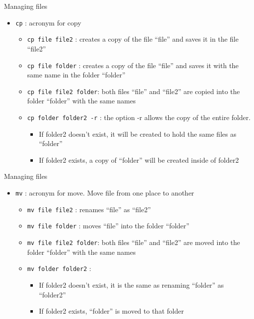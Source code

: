 \documentclass[
  ignorenonframetext,
]{beamer}
\providecommand{\tightlist}{%
  \setlength{\itemsep}{0pt}\setlength{\parskip}{0pt}}
\begin{document}
\begin{frame}[fragile]{Managing files}
\protect\hypertarget{slide14}{}
\begin{itemize}[<+->]
\tightlist
\item
  {\texttt{cp}} : acronym for copy

  \begin{itemize}[<+->]
  \tightlist
  \item
    {\texttt{cp\ file\ file2}} : creates a copy of the file ``file'' and
    saves it in the file ``file2''
  \item
    {\texttt{cp\ file\ folder}} : creates a copy of the file ``file''
    and saves it with the same name in the folder ``folder''
  \item
    {\texttt{cp\ file\ file2\ folder}}: both files ``file'' and
    ``file2'' are copied into the folder ``folder'' with the same names
  \item
    {\texttt{cp\ folder\ folder2\ -r}} : the option -r allows the copy
    of the entire folder.

    \begin{itemize}[<+->]
    \tightlist
    \item
      If folder2 doesn't exist, it will be created to hold the same
      files as ``folder''
    \item
      If folder2 exists, a copy of ``folder'' will be created inside of
      folder2
    \end{itemize}
  \end{itemize}
\end{itemize}
\end{frame}

\begin{frame}[fragile]{Managing files}
\protect\hypertarget{slide15}{}
\begin{itemize}[<+->]
\tightlist
\item
  {\texttt{mv}} : acronym for move. Move file from one place to another

  \begin{itemize}[<+->]
  \tightlist
  \item
    {\texttt{mv\ file\ file2}} : renames ``file'' as ``file2''
  \item
    {\texttt{mv\ file\ folder}} : moves ``file'' into the folder
    ``folder''
  \item
    {\texttt{mv\ file\ file2\ folder}}: both files ``file'' and
    ``file2'' are moved into the folder ``folder'' with the same names
  \item
    {\texttt{mv\ folder\ folder2}} :

    \begin{itemize}[<+->]
    \tightlist
    \item
      If folder2 doesn't exist, it is the same as renaming ``folder'' as
      ``folder2''
    \item
      If folder2 exists, ``folder'' is moved to that folder
    \end{itemize}
  \end{itemize}
\end{itemize}
\end{frame}
\end{document}
